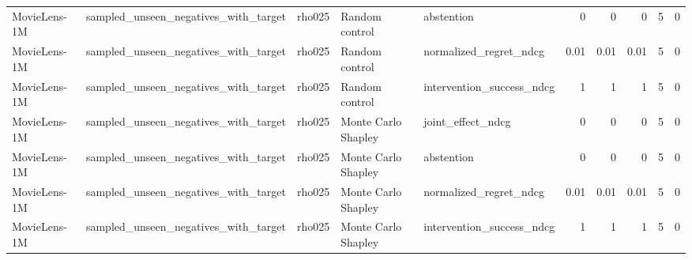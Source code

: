 \begin{table}[t]
{\begin{tabular}{lllllrrrrr}
MovieLens-1M & sampled\_unseen\_negatives\_with\_target & rho025 & Random control & abstention & 0 & 0 & 0 & 5 & 0 \\
MovieLens-1M & sampled\_unseen\_negatives\_with\_target & rho025 & Random control & normalized\_regret\_ndcg & 0.01 & 0.01 & 0.01 & 5 & 0 \\
MovieLens-1M & sampled\_unseen\_negatives\_with\_target & rho025 & Random control & intervention\_success\_ndcg & 1 & 1 & 1 & 5 & 0 \\
MovieLens-1M & sampled\_unseen\_negatives\_with\_target & rho025 & Monte Carlo Shapley & joint\_effect\_ndcg & 0 & 0 & 0 & 5 & 0 \\
MovieLens-1M & sampled\_unseen\_negatives\_with\_target & rho025 & Monte Carlo Shapley & abstention & 0 & 0 & 0 & 5 & 0 \\
MovieLens-1M & sampled\_unseen\_negatives\_with\_target & rho025 & Monte Carlo Shapley & normalized\_regret\_ndcg & 0.01 & 0.01 & 0.01 & 5 & 0 \\
MovieLens-1M & sampled\_unseen\_negatives\_with\_target & rho025 & Monte Carlo Shapley & intervention\_success\_ndcg & 1 & 1 & 1 & 5 & 0 \\
\bottomrule
\end{tabular}
}
\end{table}
